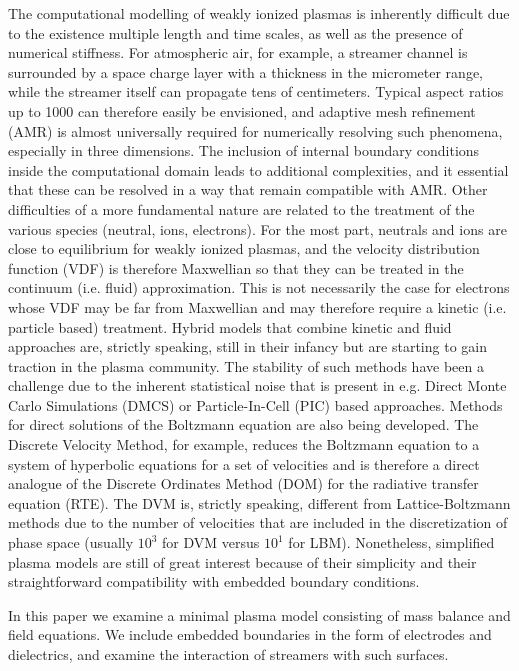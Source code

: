 \documentclass[3p]{elsarticle}
\begin{document}
The computational modelling of weakly ionized plasmas is inherently difficult due to the existence multiple length and time scales, as well as the presence of numerical stiffness. For atmospheric air, for example, a streamer channel is surrounded by a space charge layer with a thickness in the micrometer range, while the streamer itself can propagate tens of centimeters. Typical aspect ratios up to 1000 can therefore easily be envisioned, and adaptive mesh refinement (AMR) is almost universally required for numerically resolving such phenomena, especially in three dimensions. The inclusion of internal boundary conditions inside the computational domain leads to additional complexities, and it essential that these can be resolved in a way that remain compatible with AMR. Other difficulties of a more fundamental nature are related to the treatment of the various species (neutral, ions, electrons). For the most part, neutrals and ions are close to equilibrium for weakly ionized plasmas, and the velocity distribution function (VDF) is therefore Maxwellian so that they can be treated in the continuum (i.e. fluid) approximation. This is not necessarily the case for electrons whose VDF may be far from Maxwellian and may therefore require a kinetic (i.e. particle based) treatment. Hybrid models that combine kinetic and fluid approaches are, strictly speaking, still in their infancy but are starting to gain traction in the plasma community. The stability of such methods have been a challenge due to the inherent statistical noise that is present in e.g. Direct Monte Carlo Simulations (DMCS) or Particle-In-Cell (PIC) based approaches. Methods for direct solutions of the Boltzmann equation are also being developed. The Discrete Velocity Method, for example, reduces the Boltzmann equation to a system of hyperbolic equations for a set of velocities and is therefore a direct analogue of the Discrete Ordinates Method (DOM) for the radiative transfer equation (RTE). The DVM is, strictly speaking, different from Lattice-Boltzmann methods due to the number of velocities that are included in the discretization of phase space (usually $10^3$ for DVM versus $10^1$ for LBM). Nonetheless, simplified plasma models are still of great interest because of their simplicity and their straightforward compatibility with embedded boundary conditions. 

In this paper we examine a minimal plasma model consisting of mass balance and field equations. We include embedded boundaries in the form of electrodes and dielectrics, and examine the interaction of streamers with such surfaces. 
\end{document}
